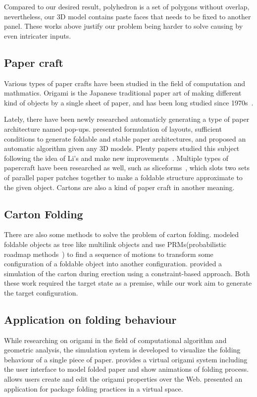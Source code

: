 \documentclass[submission]{gmp2018}
\begin{document}
Compared to our desired result, polyhedron is a set of polygons without overlap, nevertheless, our 3D model contains paste faces that needs to be fixed to another panel. These works above justify our problem being harder to solve causing by even intricater inputs.

\subsection{Paper craft} 
Various types of paper crafts have been studied in the field of computation and mathmatics. Origami is the Japanese traditional paper art of making different kind of objects by a single sheet of paper, and has been long studied since 1970s~\cite{KANADE1980279}. 

Lately, there have been newly researched automaticly generating a type of paper architecture named pop-ups. \cite{Li:2010:PAP:1833349.1778848} presented formulation of layouts, sufficient conditions to generate foldable and stable paper architectures, and proposed an automatic algorithm given any 3D models. Plenty papers studied this subject following the idea of Li's and make new improvements~\cite{Le:2014:SCO:2574223.2574468,Li:2011:GSV:1964921.1964993,Ruiz:2013:GMP:2542355.2542360}. Multiple types of papercraft have been researched as well, such as sliceforms~\cite{Le-Nguyen:2013:APS:2553684.2553686,McCrae:2011:SSB:2070781.2024202,Schwartzburg13}, which slots two sets of parallel paper patches together to make a foldable structure approximate to the given object. Cartons are also a kind of paper craft in another meaning.

\subsection{Carton Folding}
There are also some methods to solve the problem of carton folding. \cite{Song:2000:MPA:892954} modeled foldable objects as tree like multilink objects and use PRMs(probabilistic roadmap methods~\cite{Kavraki:1994:PRP:891758}) to find a sequence of motions to transform some configuration of a foldable object into another configuration. \cite{Mullineux:2010:CSC:1739328.1739673} provided a simulation of the carton during erection using a constraint-based approach. Both these work required the target state as a premise, while our work aim to generate the target configuration.

\subsection{Application on folding behaviour}
While researching on origami in the field of computational algorithm and geometric analysis, the simulation system is developed to visualize the folding behaviour of a single piece of paper. \cite{Thiel1998} provides a virtual origami system including the user interface to model folded paper and show animations of folding process. \cite{Kishi:1998:OFP:786112.786279} allows users create and edit the origami properties over the Web. \cite{Nimnual2007Virtual} presented an application for package folding practices in a virtual space.
\end{document}
